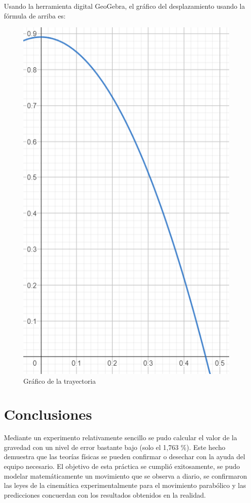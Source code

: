 \documentclass[a4paper]{article}
\begin{document}
Usando la herramienta digital GeoGebra, el gráfico del desplazamiento usando la fórmula de arriba es:
\begin{figure} [H]
    \centering
    \includegraphics{Figura_Mov_Parabolico.png}
    \caption{Gráfico de la trayectoria}
    \label{Trayectoria}
\end{figure}

\section{Conclusiones}

Mediante un experimento relativamente sencillo se pudo calcular el valor de la gravedad con un nivel de error bastante bajo (solo el 1,763 \%). Este hecho demuestra que las teorías físicas se pueden confirmar o desechar con la ayuda del equipo necesario. El objetivo de esta práctica se cumplió exitosamente, se pudo modelar matemáticamente un movimiento que se observa a diario, se confirmaron las leyes de la cinemática experimentalmente para el movimiento parabólico y las predicciones concuerdan con los resultados obtenidos en la realidad. 
\end{document}
